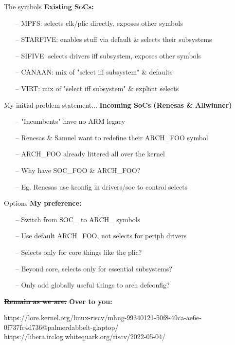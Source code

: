\documentclass{beamer}
\begin{document}
\begin{frame}{The symbols}
	\textbf{Existing SoCs:}
	\begin{itemize}
		\item[--]
		MPFS: selects clk/plic directly, exposes other symbols
		\item[--]
		STARFIVE: enables stuff via default \& selects their subsystems
		\item[--]
		SIFIVE: selects drivers iff subsystem, exposes other symbols
		\item[--]
		CANAAN: mix of "select iff subsystem" \& defaults
		\item[--]
		VIRT: mix of "select iff subsystem" \& explicit selects
	\end{itemize}
	\pause
	My initial problem statement...\newline \pause
	\textbf{Incoming SoCs (Renesas \& Allwinner)}
	\begin{itemize}
		\item[--]
		"Incumbents" have no ARM legacy
		\item[--]
		Renesas \& Samuel want to redefine their ARCH\_FOO symbol
		\item[--]
		ARCH\_FOO already littered all over the kernel
		\item[--]
		Why have SOC\_FOO \& ARCH\_FOO?
		\item[--]
		Eg. Renesas use kconfig in drivers/soc to control selects
	\end{itemize}
\end{frame}

\begin{frame}{Options}
	\textbf{My preference:}
	\begin{itemize}
		\item[--]
		Switch from SOC\_ to ARCH\_ symbols
		\item[--]
		Use default ARCH\_FOO, not selects for periph drivers
		\item[--]
		Selects only for core things like the plic?
		\item[--]
		Beyond core, selects only for essential subsystems?
		\item[--]
		Only add globally useful things to arch defconfig?
	\end{itemize}
	\pause
	\st{\textbf{Remain as we are:}}\newline
	\pause
	\textbf{Over to you:}
\end{frame}

\begin{thebibliography}{}
	https://lore.kernel.org/linux-riscv/mhng-99340121-50f8-49ca-ae6e-0f737fc4d736@palmerdabbelt-glaptop/ 
	https://libera.irclog.whitequark.org/riscv/2022-05-04/ 
\end{thebibliography}{}
\end{document}
